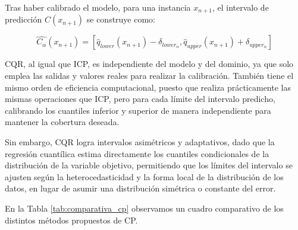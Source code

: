 Tras haber calibrado el modelo, para una instancia $x_{n+1}$, el intervalo de predicción $C(x_{n+1})$ se
construye como:

$$
\hat{C_\alpha}(x_{n+1}) = 
        \left[ 
            \hat{q}_{lower}(x_{n+1}) - \delta_{lower_\alpha}, 
            \hat{q}_{upper}(x_{n+1}) + \delta_{upper_\alpha}
        \right]
$$

CQR, al igual que ICP, es independiente del modelo y del dominio, ya que solo emplea las salidas y 
valores reales para realizar la calibración. También tiene el mismo orden de eficiencia computacional, puesto 
que realiza prácticamente las mismas operaciones que ICP, pero para cada límite del intervalo predicho, 
calibrando los cuantiles inferior y superior de manera independiente para mantener la cobertura deseada.

Sin embargo, CQR logra intervalos asimétricos y adaptativos, dado que la regresión cuantílica
estima directamente los cuantiles condicionales de la distribución de la variable objetivo,
permitiendo que los límites del intervalo se ajusten según la heterocedasticidad y la forma local de la 
distribución de los datos, en lugar de asumir una distribución simétrica o constante del error. 

En la Tabla \ref{tab:comparativa_cp} observamos un cuadro comparativo de los distintos métodos propuestos de 
CP. 


